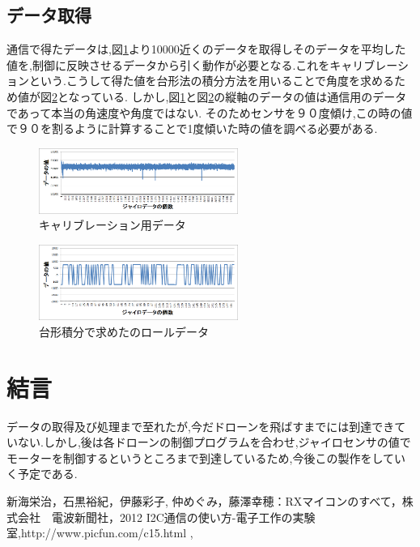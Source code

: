 \documentclass[twocolumn,11pt]{abst}
\begin{document}
\subsection{データ取得}
通信で得たデータは,図\ref{fig:roll}より10000近くのデータを取得しそのデータを平均した値を,制御に反映させるデータから引く動作が必要となる.これをキャリブレーションという.こうして得た値を台形法の積分方法を用いることで角度を求めるため値が図\ref{fig:roll_deg}となっている.
しかし,図\ref{fig:roll}と図\ref{fig:roll_deg}の縦軸のデータの値は通信用のデータであって本当の角速度や角度ではない.
そのためセンサを９０度傾け,この時の値で９０を割るように計算することで1度傾いた時の値を調べる必要がある.

\begin{figure}[htbp]
  \begin{center}
    \includegraphics[width=65mm]{roll.png}
    \end{center}
  \caption{キャリブレーション用データ}
 \label{fig:roll}
\end{figure}

\begin{figure}[htbp]
  \begin{center}
    \includegraphics[width=65mm]{roll_deg.png}
    \end{center}
  \caption{台形積分で求めたのロールデータ}
 \label{fig:roll_deg}
\end{figure}

\section{結言}
データの取得及び処理まで至れたが,今だドローンを飛ばすまでには到達できていない.しかし,後は各ドローンの制御プログラムを合わせ,ジャイロセンサの値でモーターを制御するというところまで到達しているため,今後この製作をしていく予定である.

\begin{thebibliography}{8}
 新海栄治，石黒裕紀，伊藤彩子, 仲めぐみ，藤澤幸穂：RXマイコンのすべて，株式会社　電波新聞社，2012
 I2C通信の使い方-電子工作の実験室,http://www.picfun.com/c15.html , 
\end{thebibliography}
\end{document}
